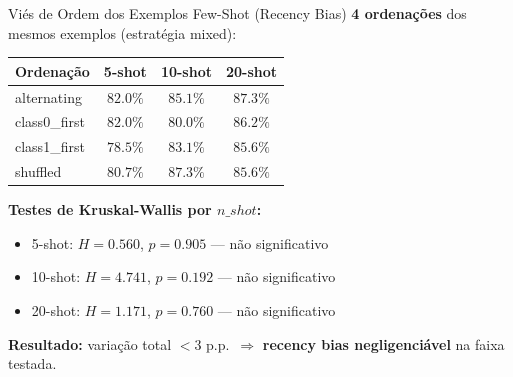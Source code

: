 \documentclass[aspectratio=169,10pt]{beamer}
\begin{document}
\begin{frame}{Vi\'es de Ordem dos Exemplos Few-Shot (Recency Bias)}
  \scriptsize
  \textbf{4 ordena\c{c}\~oes} dos mesmos exemplos (estrat\'egia mixed):
  \begin{center}
  \begin{tabular}{lccc}
    \toprule
    \textbf{Ordena\c{c}\~ao} & \textbf{5-shot} & \textbf{10-shot} & \textbf{20-shot} \\
    \midrule
    alternating   & $82.0\%$ & $85.1\%$ & $87.3\%$ \\
    class0\_first & $82.0\%$ & $80.0\%$ & $86.2\%$ \\
    class1\_first & $78.5\%$ & $83.1\%$ & $85.6\%$ \\
    shuffled      & $80.7\%$ & $87.3\%$ & $85.6\%$ \\
    \bottomrule
  \end{tabular}
  \end{center}
  \medskip

  \textbf{Testes de Kruskal-Wallis por $n\_shot$:}
  \begin{itemize}
    \item 5-shot:  $H = 0.560$, $p = 0.905$ --- n\~ao significativo
    \item 10-shot: $H = 4.741$, $p = 0.192$ --- n\~ao significativo
    \item 20-shot: $H = 1.171$, $p = 0.760$ --- n\~ao significativo
  \end{itemize}
  \medskip

  \textbf{Resultado:} varia\c{c}\~ao total $< 3$ p.p.\ $\Rightarrow$ \textbf{recency bias negligenci\'avel} na faixa testada.
\end{frame}
\end{document}
